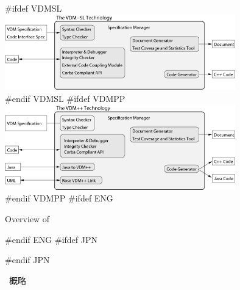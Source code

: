 \documentclass[\pformat,12pt]{article}
\begin{document}
\begin{figure}
\begin{center}

#ifdef VDMSL
\includegraphics[width=10cm]{vdmtools_sl.png}
#endif VDMSL
#ifdef VDMPP
\includegraphics[width=10cm]{vdmtools_pp.png}
#endif VDMPP
#ifdef ENG
\caption{Overview of \protect\VDMTools}
#endif ENG
#ifdef JPN
\caption{\protect\VDMTools\ 概略}
#endif JPN
\label{fig:toolbox}
\end{center}
\end{figure}
\end{document}
